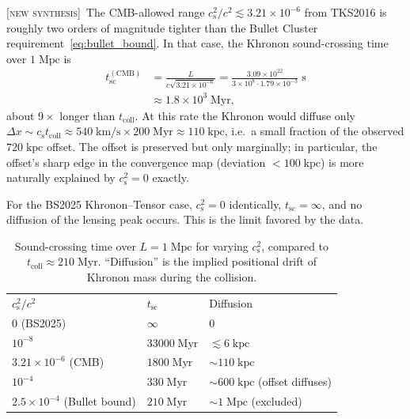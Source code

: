 \documentclass[prd,twocolumn,superscriptaddress,longbibliography,floatfix]{revtex4-2}
\newcommand{\cs}{c_{\mathrm{s}}}
\newcommand{\new}{\textsc{[new synthesis]}}
\begin{document}
\new\ The CMB-allowed range $\cs^{2}/c^{2} \lesssim
3.21 \times 10^{-6}$ from TKS2016 is roughly two
orders of magnitude tighter than the Bullet
Cluster requirement~\eqref{eq:bullet_bound}.  In
that case, the Khronon sound-crossing time over
$1\;\mathrm{Mpc}$ is
\begin{align}
t_{\mathrm{sc}}^{(\mathrm{CMB})}
&= \frac{L}{c\sqrt{3.21 \times 10^{-6}}}
= \frac{3.09 \times 10^{22}}
       {3 \times 10^{8} \cdot 1.79 \times 10^{-3}}\;\mathrm{s}\nonumber\\
&\approx 1.8 \times 10^{3}\;\mathrm{Myr},
\label{eq:tsc_CMB}
\end{align}
about $9\times$ longer than $t_{\mathrm{coll}}$.
At this rate the Khronon would diffuse only
$\Delta x \sim \cs t_{\mathrm{coll}} \approx
540\;\mathrm{km/s} \times 200\;\mathrm{Myr}
\approx 110\;\mathrm{kpc}$, i.e.\ a small fraction of
the observed $720\;\mathrm{kpc}$ offset.  The offset
is preserved but only marginally; in particular,
the offset's sharp edge in the convergence map
(deviation $< 100\;\mathrm{kpc}$) is more naturally
explained by $\cs^{2} = 0$ exactly.

For the BS2025 Khronon--Tensor case, $\cs^{2} = 0$
identically, $t_{\mathrm{sc}} = \infty$, and no
diffusion of the lensing peak occurs.  This is the
limit favored by the data.

\begin{table}[b]
\caption{\label{tab:bullet}Sound-crossing time over
$L = 1\;\mathrm{Mpc}$ for varying $\cs^{2}$, compared
to $t_{\mathrm{coll}} \approx 210\;\mathrm{Myr}$.
``Diffusion'' is the implied positional drift of
Khronon mass during the collision.}
\begin{ruledtabular}
\begin{tabular}{lll}
$\cs^{2}/c^{2}$ & $t_{\mathrm{sc}}$ & Diffusion \\
\colrule
$0$ (BS2025)  & $\infty$           & $0$ \\
$10^{-8}$     & $33000\;\mathrm{Myr}$ & $\lesssim 6\;\mathrm{kpc}$ \\
$3.21 \times 10^{-6}$ (CMB)
              & $1800\;\mathrm{Myr}$  & $\sim 110\;\mathrm{kpc}$ \\
$10^{-4}$     & $330\;\mathrm{Myr}$   & $\sim 600\;\mathrm{kpc}$
   (offset diffuses) \\
$2.5 \times 10^{-4}$ (Bullet bound)
              & $210\;\mathrm{Myr}$   & $\sim 1\;\mathrm{Mpc}$
   (excluded) \\
\end{tabular}
\end{ruledtabular}
\end{table}
\end{document}
